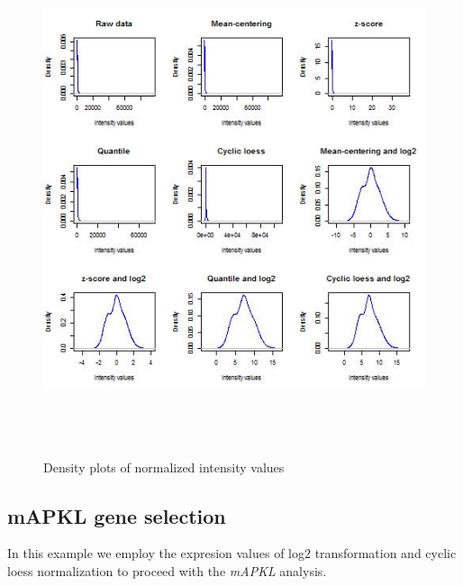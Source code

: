 \documentclass[12pt]{article}\usepackage[]{graphicx}\usepackage[usenames,dvipsnames]{color}
\begin{document}
\begin{figure}[]
\centering
\includegraphics[width=15cm,height=15cm,keepaspectratio]{../man/figures/density_train}
\caption{Density plots of normalized intensity values}
\end{figure}

\subsection{mAPKL gene selection}
\noindent In this example we employ the expresion values of log2 transformation 
and cyclic loess normalization to proceed with the \emph{mAPKL} analysis.
\end{document}
